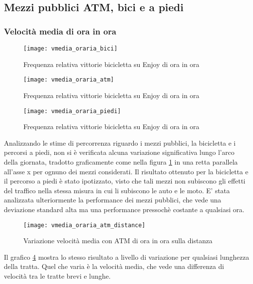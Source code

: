 \subsection{Mezzi pubblici ATM, bici e a piedi}

\subsubsection{Velocità media di ora in ora}


\begin{figure}[H]
	\texttt{[image: vmedia\_oraria\_bici]}
	\caption{Frequenza relativa vittorie bicicletta su Enjoy di ora in ora}
	\label{image:11}
\end{figure}



\begin{figure}[H]
	\texttt{[image: vmedia\_oraria\_atm]}
	\caption{Frequenza relativa vittorie bicicletta su Enjoy di ora in ora}
	\label{image:17}
\end{figure}

\begin{figure}[H]
	\texttt{[image: vmedia\_oraria\_piedi]}
	\caption{Frequenza relativa vittorie bicicletta su Enjoy di ora in ora}
	\label{image:18}
\end{figure}

Analizzando le stime di percorrenza riguardo i mezzi pubblici, la bicicletta e i percorsi a piedi, non si è verificata alcuna variazione significativa lungo l'arco della giornata, tradotto graficamente come nella figura \ref{image:11} in una retta parallela all'asse x per ognuno dei mezzi considerati. Il risultato ottenuto per la bicicletta e il percorso a piedi è stato ipotizzato, visto che tali mezzi non subiscono gli effetti del traffico nella stessa misura in cui li subiscono le auto e le moto. E' stata analizzata ulteriormente la performance dei mezzi pubblici, che vede una deviazione standard alta ma una performance pressochè costante a qualsiasi ora.

\begin{figure}[H]
\texttt{[image: vmedia\_oraria\_atm\_distance]}
\caption{Variazione velocità media con ATM di ora in ora sulla distanza}
\label{image:12}
\end{figure}

Il grafico \ref{image:12} mostra lo stesso risultato a livello di variazione per qualsiasi lunghezza della tratta. Quel che varia è la velocità media, che vede una differenza di velocità tra le tratte brevi e lunghe.

